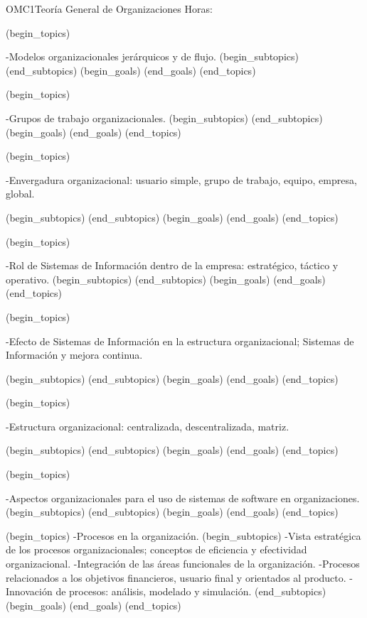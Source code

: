 \begin{BKL2}{OMC1}{Teoría General de Organizaciones}
Horas:
 
(begin_topics)

-Modelos organizacionales jerárquicos y de flujo.
(begin_subtopics)
(end_subtopics)
(begin_goals)
(end_goals)
(end_topics)

 

(begin_topics)

-Grupos de trabajo organizacionales.
(begin_subtopics)
(end_subtopics)
(begin_goals)
(end_goals)
(end_topics)

 

(begin_topics)

-Envergadura organizacional: usuario simple, grupo de trabajo, equipo, empresa, global.

(begin_subtopics)
(end_subtopics)
(begin_goals)
(end_goals)
(end_topics)

 

(begin_topics)

-Rol de Sistemas de Información dentro de la empresa: estratégico, táctico y operativo.
(begin_subtopics)
(end_subtopics)
(begin_goals)
(end_goals)
(end_topics)

 

(begin_topics)

-Efecto de Sistemas de Información en la estructura organizacional; Sistemas de Información y mejora continua.

(begin_subtopics)
(end_subtopics)
(begin_goals)
(end_goals)
(end_topics)

 

(begin_topics)

-Estructura organizacional: centralizada, descentralizada, matriz.

(begin_subtopics)
(end_subtopics)
(begin_goals)
(end_goals)
(end_topics)

 

(begin_topics)

-Aspectos organizacionales para el uso de sistemas de software en organizaciones.
(begin_subtopics)
(end_subtopics)
(begin_goals)
(end_goals)
(end_topics)

(begin_topics)
-Procesos en la organización.
(begin_subtopics)
-Vista estratégica de los procesos organizacionales; conceptos de eficiencia y efectividad organizacional.
-Integración de las áreas funcionales de la organización.
-Procesos relacionados a los objetivos financieros, usuario final y orientados al producto.
-Innovación de procesos: análisis, modelado y simulación. 
(end_subtopics)
(begin_goals)
(end_goals)
(end_topics)


\end{BKL2}
